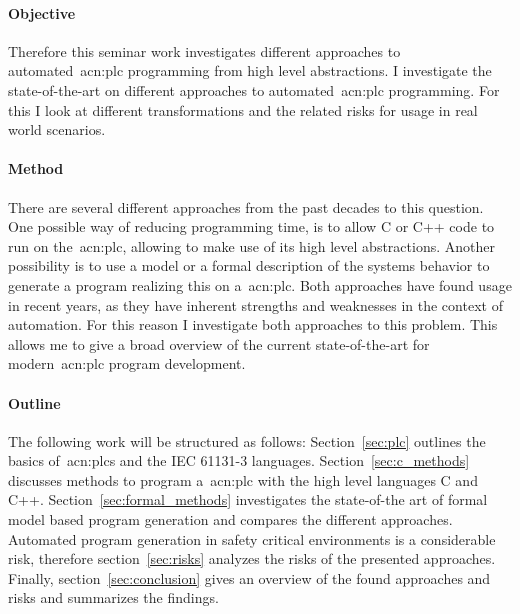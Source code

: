 \paragraph{Objective}
Therefore this seminar work investigates different approaches to automated~\gls{acn:plc} programming from high level abstractions.
I investigate the state-of-the-art on different approaches to automated~\gls{acn:plc} programming.
For this I look at different transformations and the related risks for usage in real world scenarios.

\paragraph{Method}
There are several different approaches from the past decades to this question.
One possible way of reducing programming time, is to allow C or C++ code to run on the~\gls{acn:plc}, allowing to make use of its high level abstractions.
Another possibility is to use a model or a formal description of the systems behavior to generate a program realizing this on a~\gls{acn:plc}.
Both approaches have found usage in recent years, as they have inherent strengths and weaknesses in the context of automation.
For this reason I investigate both approaches to this problem.
This allows me to give a broad overview of the current state-of-the-art for modern~\gls{acn:plc} program development.

\paragraph{Outline}
The following work will be structured as follows: 
Section~\ref{sec:plc} outlines the basics of~\glspl{acn:plc} and the IEC 61131-3 languages. 
Section~\ref{sec:c_methods} discusses methods to program a~\gls{acn:plc} with the high level languages C and C++.
Section~\ref{sec:formal_methods} investigates the state-of-the art of formal model based program generation and compares the different approaches.
Automated program generation in safety critical environments is a considerable risk, therefore section~\ref{sec:risks} analyzes the risks of the presented approaches.
Finally, section~\ref{sec:conclusion} gives an overview of the found approaches and risks and summarizes the findings.